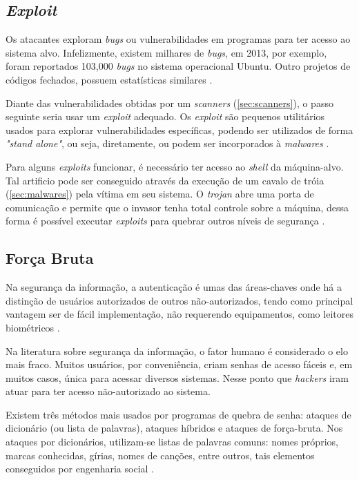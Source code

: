 \subsection{\textit{Exploit}} \label{sec:exploit}

Os atacantes exploram \textit{bugs} ou vulnerabilidades em programas para ter acesso ao sistema alvo. Infelizmente, existem milhares de \textit{bugs}, em 2013, por exemplo, foram reportados 103,000 \textit{bugs} no sistema operacional Ubuntu. Outro projetos de códigos fechados, possuem estatísticas similares \cite{aeg:thanassis}.

Diante das vulnerabilidades obtidas por um \textit{scanners} (\autoref{sec:scanners}), o passo seguinte seria usar um \textit{exploit} adequado. Os \textit{exploit} são pequenos utilitários usados para explorar vulnerabilidades específicas, podendo ser utilizados de forma \textit{"stand alone"}, ou seja, diretamente, ou podem ser incorporados à \textit{malwares} \cite{exploit:cassio}.

Para alguns \textit{exploits} funcionar, é necessário ter acesso ao \textit{shell} da máquina-alvo. Tal artificio pode ser conseguido através da execução de um cavalo de tróia (\autoref{sec:malwares}) pela vítima em seu sistema. O \textit{trojan} abre uma porta de comunicação e permite que o invasor tenha total controle sobre a máquina, dessa forma é possível executar \textit{exploits} para quebrar outros níveis de segurança \cite{univhacker}.

\subsection{Força Bruta} \label{sec:forçabruta}

Na segurança da informação, a autenticação é umas das áreas-chaves onde há a distinção de usuários autorizados de outros não-autorizados, tendo como principal vantagem ser de fácil implementação, não requerendo equipamentos, como leitores biométricos \cite{denise-lilian}.

Na literatura sobre segurança da informação, o fator humano é considerado o elo mais fraco. Muitos usuários, por conveniência, criam senhas de acesso fáceis e, em muitos casos, única para acessar diversos sistemas. Nesse ponto que \textit{hackers} iram atuar para ter acesso não-autorizado ao sistema. 

Existem três métodos mais usados por programas de quebra de senha: ataques de dicionário (ou lista de palavras), ataques híbridos e ataques de força-bruta. Nos ataques por dicionários, utilizam-se listas de palavras comuns: nomes próprios, marcas conhecidas, gírias, nomes de canções, entre outros, tais elementos conseguidos por engenharia social \cite{univhacker}. 

